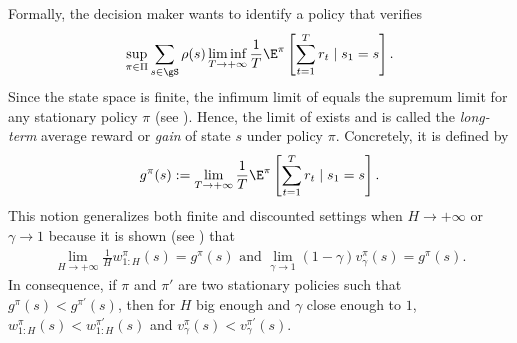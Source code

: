 Formally, the decision maker wants to identify a policy that verifies
\begin{equation}
    \label{eq:avg_obj}
    \sup_{\pi\in\Pi}\sum_{s\in\gS}\rho(s)\liminf_{T\to+\infty}\frac1T \E^\pi\left[ \sum_{t=1}^{T} r_t \mid s_1=s\right].
\end{equation}
Since the state space is finite, the infimum limit of  equals the supremum limit for any stationary policy $\pi$ (see \cite[Chapter~8]{puterman2014markov}).
Hence, the limit of  exists and is called the \emph{long-term} average reward or \emph{gain} of state $s$ under policy $\pi$.
Concretely, it is defined by
\begin{equation}
    \label{eq:gain_defn}
    g^\pi(s) := \lim_{T\to+\infty}\frac1T \E^\pi\left[ \sum_{t=1}^{T} r_t \mid s_1=s\right].
\end{equation}
This notion generalizes both finite and discounted settings when $H\to+\infty$ or $\gamma\to1$ because it is shown (see \cite[Sections~8.2.1 and 8.2.2]{puterman2014markov}) that 
\begin{align*}
    \lim_{H\to+\infty}\frac1H w^\pi_{1:H}(s) =g^\pi(s) \text{ and }
    \lim_{\gamma\to1}(1-\gamma)v^\pi_\gamma(s) =g^\pi(s).
\end{align*}
In consequence, if $\pi$ and $\pi'$ are two stationary policies such that $g^\pi(s)< g^{\pi'}(s)$, then for $H$ big enough and $\gamma$ close enough to $1$, $w_{1:H}^\pi(s)< w_{1:H}^{\pi'}(s)$ and $v^\pi_\gamma(s)< v^{\pi'}_\gamma(s)$.

